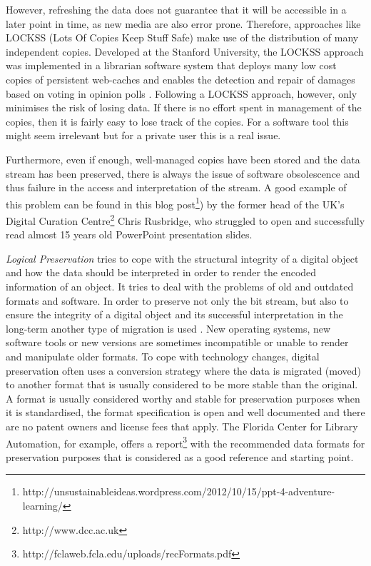 However, refreshing the data does not guarantee that it will be accessible in a later point in time, as new media are also error prone. Therefore, approaches like LOCKSS (Lots Of Copies Keep Stuff Safe) \cite{reich2001lpw} make use of the distribution of many independent copies. Developed at the Stanford University, the LOCKSS approach was implemented in a librarian software system that deploys many low cost copies of persistent web-caches and enables the detection and repair of damages based on voting in opinion polls \cite{Maniatis:2003:PPR:1165389.945451}.
Following a LOCKSS approach, however, only minimises the risk of losing data. If there is no effort spent in management of the copies, then it is fairly easy to lose track of the copies. For a software tool this might seem irrelevant but for a private user this is a real issue.

Furthermore, even if enough, well-managed copies have been stored and the data stream has been preserved, there is always the issue of software obsolescence and thus failure in the access and interpretation of the stream. A good example of this problem can be found in this blog post\footnote{http://unsustainableideas.wordpress.com/2012/10/15/ppt-4-adventure-learning/}) by the former head of the UK's Digital Curation Centre\footnote{http://www.dcc.ac.uk} Chris Rusbridge, who struggled to open and successfully read almost 15 years old PowerPoint presentation slides. \newline

\textit{Logical Preservation} tries to cope with the structural integrity of a digital object and how the data should be interpreted in order to render the encoded information of an object. It tries to deal with the problems of old and outdated formats and software. In order to preserve not only the bit stream, but also to ensure the integrity of a digital object and its successful interpretation in the long-term another type of migration is used \cite{Lee:2002:SOTADP}. New operating systems, new software tools or new versions are sometimes incompatible or unable to render and manipulate older formats. To cope with technology changes, digital preservation often uses a conversion strategy where the data is migrated (moved) to another format that is usually considered to be more stable than the original. A format is usually considered worthy and stable for preservation purposes when it is standardised, the format specification is open and well documented and there are no patent owners and license fees that apply. The Florida Center for Library Automation, for example, offers a report\footnote{http://fclaweb.fcla.edu/uploads/recFormats.pdf} with the recommended data formats for preservation purposes that is considered as a good reference and starting point. 

